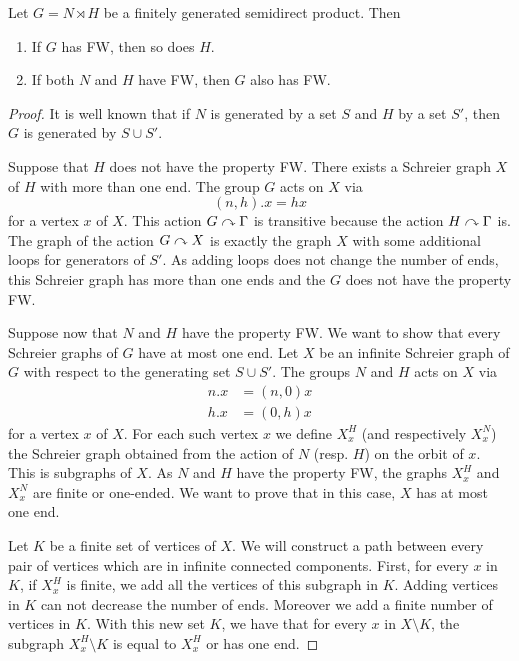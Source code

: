 \begin{lem}\label{Lemma:Semidirect_ends}
Let $G = N \rtimes H$ be a finitely generated semidirect product. Then
\begin{enumerate}
\item If $G$ has FW, then so does $H$.
\item If both $N$ and $H$ have FW, then $G$ also has FW.
\end{enumerate}
\end{lem}
%
\begin{proof}
It is well known that if $N$ is generated by a set $S$ and $H$ by a set $S'$, then $G$ is generated by $S \cup S'$.

Suppose that $H$ does not have the property FW. There exists a Schreier graph $X$ of $H$ with more than one end. The group $G$ acts on $X$ via 
\begin{equation*}
(n,h).x = hx 
\end{equation*}
for a vertex $x$ of $X$. This action $G \curvearrowright \Gamma$ is transitive because the action $H \curvearrowright \Gamma$ is. The graph of the action $G \curvearrowright X$ is exactly the graph $X$ with some additional loops for generators of $S'$. As adding loops does not change the number of ends, this Schreier graph has more than one ends and the $G$ does not have the property FW.

Suppose now that $N$ and $H$ have the property FW. We want to show that every Schreier graphs of $G$ have at most one end. Let $X$ be an infinite Schreier graph of $G$ with respect to the generating set $S \cup S'$. The groups $N$ and $H$ acts on $X$ via
\begin{align*}
n.x &= (n,0)x \\
h.x &= (0,h)x
\end{align*}
for a vertex $x$ of $X$. For each such vertex $x$ we define $X_x^H$ (and respectively $X_x^N$) the Schreier graph obtained from the action of $N$ (resp. $H$) on the orbit of $x$. This is subgraphs of $X$. As $N$ and $H$ have the property FW, the graphs $X_x^H$ and $X_x^N$ are finite or one-ended. We want to prove that in this case, $X$ has at most one end. 

Let $K$ be a finite set of vertices of $X$. We will construct a path between every pair of vertices which are in infinite connected components. First, for every $x$ in $K$, if $X_x^H$ is finite, we add all the vertices of this subgraph in $K$. Adding vertices in $K$ can not decrease the number of ends. Moreover we add a finite number of vertices in $K$. With this new set $K$, we have that for every $x$ in $X \setminus K$, the subgraph $X_x^H \setminus K$ is equal to $X_x^H$ or has one end. 


\end{proof}

